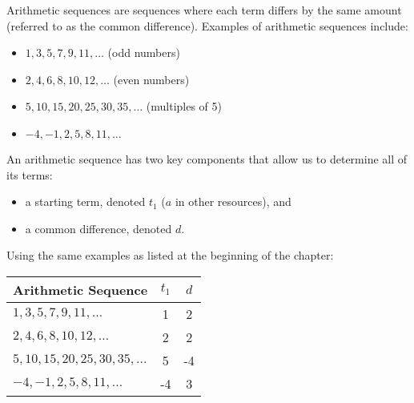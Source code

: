 Arithmetic sequences are sequences where each term differs by the same amount (referred to as the common difference). Examples of arithmetic sequences include:

\begin{itemize}
  \item $1, 3, 5, 7, 9, 11, \dots$ (odd numbers)
  \item $2, 4, 6, 8, 10, 12, \dots$ (even numbers)
  \item $5, 10, 15, 20, 25, 30, 35, \dots$ (multiples of 5)
  \item $-4, -1, 2, 5, 8, 11, \dots$ 
\end{itemize}

An arithmetic sequence has two key components that allow us to determine all of its terms:

\begin{itemize}
  \item a starting term, denoted $t_1$ ($a$ in other resources), and
  \item a common difference, denoted $d$.
\end{itemize}

\begin{tcolorbox}[enhanced,
  attach boxed title to top left,
  colback=blue!5!white,
  colframe=blue!75!black,
  colbacktitle=red!80!black,
  title=Example,
  fonttitle=\bfseries,
  boxed title style={size=small,colframe=red!50!black}
  ]

  Using the same examples as listed at the beginning of the chapter:

  \begin{tabular}{|l|c|c|}
    \hline
    Arithmetic Sequence & $t_1$ & $d$ \\
    \hline
    $1, 3, 5, 7, 9, 11, \dots$ & 1 & 2 \\ 
    $2, 4, 6, 8, 10, 12, \dots$ & 2 & 2 \\
    $5, 10, 15, 20, 25, 30, 35, \dots$ & 5 & -4 \\
    $-4, -1, 2, 5, 8, 11, \dots$ & -4 & 3 \\
    \hline
  \end{tabular}

\end{tcolorbox}